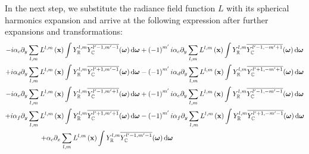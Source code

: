In the next step, we substitute the radiance field function $L$ with its spherical harmonics expansion and arrive at the following expression after further expansions and transformations:
\begin{align}
-i\alpha_c\partial_y\sum_{l,m}L^{l,m}\left (\vec{x}\right)\int{Y_{\mathbb{R}}^{l,m}\overline{\SHBC^{l'-1, m'-1}}(\vec{\omega} )\ud\vec{\omega}}
+\left({-1}\right)^{m'}i&\alpha_c\partial_y\sum_{l,m}L^{l,m}\left (\vec{x}\right)\int{Y_{\mathbb{R}}^{l,m}\overline{\SHBC^{l'-1, -m'+1}}(\vec{\omega} )\ud\vec{\omega}}
\label{eq:real_transport_expansion_unsimplified_term1_term2}
\\
+i\alpha_d\partial_y\sum_{l,m}L^{l,m}\left (\vec{x}\right)\int{Y_{\mathbb{R}}^{l,m}\overline{\SHBC^{l'+1, m'-1}}(\vec{\omega} )\ud\vec{\omega}}
-\left({-1}\right)^{m'} i &\alpha_d\partial_y\sum_{l,m}L^{l,m}\left (\vec{x}\right)\int{Y_{\mathbb{R}}^{l,m}\overline{\SHBC^{l'+1, -m'+1}}(\vec{\omega} )\ud\vec{\omega}}
\label{eq:real_transport_expansion_unsimplified_term3_term4}
\\
-i\alpha_e \partial_y\sum_{l,m}L^{l,m}\left (\vec{x}\right)\int{Y_{\mathbb{R}}^{l,m}\overline{\SHBC^{l'-1, m'+1}}(\vec{\omega} )\ud\vec{\omega}}
+\left({-1}\right)^{m'}i &\alpha_e \partial_y\sum_{l,m}L^{l,m}\left (\vec{x}\right)\int{Y_{\mathbb{R}}^{l,m}\overline{\SHBC^{l'-1, -m'-1}}(\vec{\omega} )\ud\vec{\omega}}
\\
+i\alpha_f \partial_y\sum_{l,m}L^{l,m}\left (\vec{x}\right)\int{Y_{\mathbb{R}}^{l,m}\overline{\SHBC^{l'+1, m'+1}}(\vec{\omega} )\ud\vec{\omega}}
-\left({-1}\right)^{m'}i &\alpha_f \partial_y\sum_{l,m}L^{l,m}\left (\vec{x}\right)\int{Y_{\mathbb{R}}^{l,m}\overline{\SHBC^{l'+1, -m'-1}}(\vec{\omega} )\ud\vec{\omega}}
\\
+\alpha_c\partial_x\sum_{l,m}L^{l,m}\left (\vec{x}\right)\int{Y_{\mathbb{R}}^{l,m}\overline{\SHBC^{l'-1, m'-1}}(\vec{\omega} )\ud\vec{\omega}}

\end{align}

